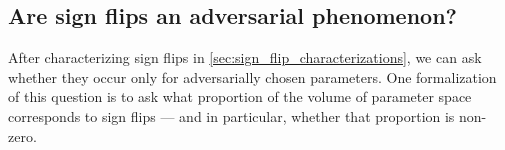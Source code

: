 %
%    
%
%
%


\subsection{Are sign flips an adversarial phenomenon?}
\label{sec:sign_flip_fraction}

After characterizing sign flips in \cref{sec:sign_flip_characterizations}, we can ask whether they occur only for adversarially chosen parameters.
One formalization of this question is to ask what proportion of the volume of parameter space corresponds to sign flips --- and in particular, whether that proportion is non-zero.

